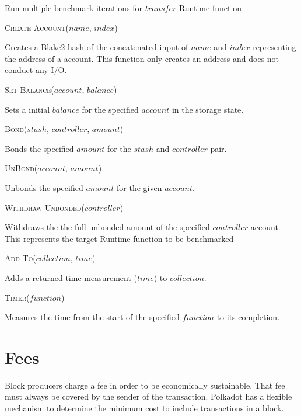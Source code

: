 \documentclass[11pt,a4paper]{article}
\newcommand{\SubItem}[1]{
    {\setlength\itemindent{15pt} \item[-] #1}
}
\begin{document}
\begin{algorithm}[H]\label{sec:algo-benchmark-transfer}
  \caption{Run multiple benchmark iterations for $transfer$ Runtime function}
  \SetAlgoLined
  \BlankLine
  \BlankLine
\end{algorithm}

\begin{itemize}
  \item \textsc{Create-Account($name$, $index$)}
    \SubItem{Creates a Blake2 hash of the concatenated input of $name$ and $index$ representing
    the address of a account. This function only creates an address and does not conduct any I/O.}
  \item \textsc{Set-Balance($account$, $balance$)}
      \SubItem{Sets a initial $balance$ for the specified $account$ in the storage state.}
  \item \textsc{Bond($stash$, $controller$, $amount$)}
    \SubItem{Bonds the specified $amount$ for the $stash$ and $controller$ pair.}
  \item \textsc{UnBond($account$, $amount$)}
    \SubItem{Unbonds the specified $amount$ for the given $account$.}
  \item \textsc{Withdraw-Unbonded($controller$)}
    \SubItem{Withdraws the the full unbonded amount of the specified $controller$ account.
    This represents the target Runtime function to be benchmarked}
  \item \textsc{Add-To($collection$, $time$)}
    \SubItem{Adds a returned time measurement ($time$) to $collection$.}
  \item \textsc{Timer($function$)}
    \SubItem{Measures the time from the start of the specified $function$ to its completion.}
\end{itemize}

\section{Fees}
Block producers charge a fee in order to be economically sustainable. That fee must always
be covered by the sender of the transaction. Polkadot has a flexible mechanism to determine
the minimum cost to include transactions in a block.
\end{document}
